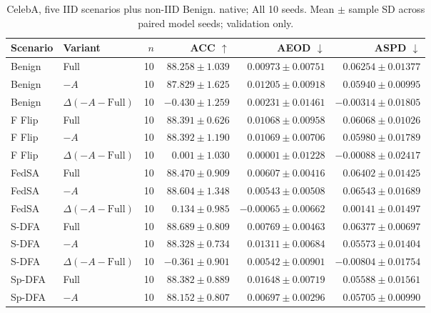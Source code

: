 \begin{table}[t]
\centering
\small
\caption{CelebA, five IID scenarios plus non-IID Benign. native; All 10 seeds. Mean $\pm$ sample SD across paired model seeds; validation only.}
\begin{tabular}{llrrrr}
\toprule
Scenario & Variant & $n$ & ACC $\uparrow$ & AEOD $\downarrow$ & ASPD $\downarrow$ \\
\midrule
Benign & Full & 10 & $88.258 \pm 1.039$ & $0.00973 \pm 0.00751$ & $0.06254 \pm 0.01377$ \\
Benign & $-A$ & 10 & $87.829 \pm 1.625$ & $0.01205 \pm 0.00918$ & $0.05940 \pm 0.00995$ \\
Benign & $\Delta(-A-\mathrm{Full})$ & 10 & $-0.430 \pm 1.259$ & $0.00231 \pm 0.01461$ & $-0.00314 \pm 0.01805$ \\
F Flip & Full & 10 & $88.391 \pm 0.626$ & $0.01068 \pm 0.00958$ & $0.06068 \pm 0.01026$ \\
F Flip & $-A$ & 10 & $88.392 \pm 1.190$ & $0.01069 \pm 0.00706$ & $0.05980 \pm 0.01789$ \\
F Flip & $\Delta(-A-\mathrm{Full})$ & 10 & $0.001 \pm 1.030$ & $0.00001 \pm 0.01228$ & $-0.00088 \pm 0.02417$ \\
FedSA & Full & 10 & $88.470 \pm 0.909$ & $0.00607 \pm 0.00416$ & $0.06402 \pm 0.01425$ \\
FedSA & $-A$ & 10 & $88.604 \pm 1.348$ & $0.00543 \pm 0.00508$ & $0.06543 \pm 0.01689$ \\
FedSA & $\Delta(-A-\mathrm{Full})$ & 10 & $0.134 \pm 0.985$ & $-0.00065 \pm 0.00662$ & $0.00141 \pm 0.01497$ \\
S-DFA & Full & 10 & $88.689 \pm 0.809$ & $0.00769 \pm 0.00463$ & $0.06377 \pm 0.00697$ \\
S-DFA & $-A$ & 10 & $88.328 \pm 0.734$ & $0.01311 \pm 0.00684$ & $0.05573 \pm 0.01404$ \\
S-DFA & $\Delta(-A-\mathrm{Full})$ & 10 & $-0.361 \pm 0.901$ & $0.00542 \pm 0.00901$ & $-0.00804 \pm 0.01754$ \\
Sp-DFA & Full & 10 & $88.382 \pm 0.889$ & $0.01648 \pm 0.00719$ & $0.05588 \pm 0.01561$ \\
Sp-DFA & $-A$ & 10 & $88.152 \pm 0.807$ & $0.00697 \pm 0.00296$ & $0.05705 \pm 0.00990$ \\

\end{tabular}
\end{table}
